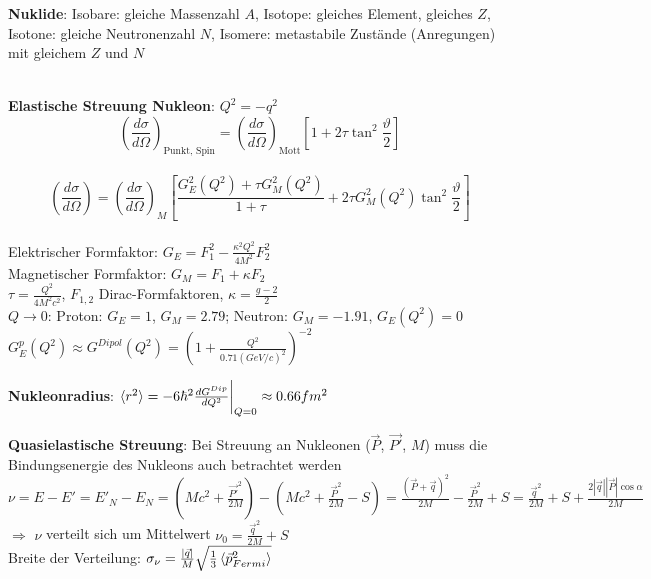 \documentclass[10pt,twoside,a4paper]{article}
\begin{document}
\begin{multicols*}{3}
\textbf{Nuklide}: Isobare: gleiche Massenzahl $A$, Isotope: gleiches Element, gleiches $Z$, Isotone: gleiche Neutronenzahl $N$, Isomere: metastabile Zustände (Anregungen) mit gleichem $Z$ und $N$

\ \\
\textbf{Elastische Streuung Nukleon}: $Q^2 = -q^2$ \\
$$\left(\frac{d\sigma}{d\Omega}\right)_{\text{Punkt, Spin}} = \left(\frac{d\sigma}{d\Omega}\right)_{\text{Mott}} \left[ 1 + 2 \tau \tan^2 \frac{\vartheta}{2} \right]$$ \\
$$\scriptscriptstyle{\left(\frac{d\sigma}{d\Omega}\right) = \left(\frac{d\sigma}{d\Omega}\right)_{M} \left[ \frac{G^2_E(Q^2) + \tau G^2_M(Q^2)}{1 + \tau} + 2 \tau G^2_M(Q^2) \tan^2 \frac{\vartheta}{2} \right]}$$ \\
Elektrischer Formfaktor: $G_E = F^2_1 - \frac{\kappa^2 Q^2}{4 M^2} F^2_2$ \\
Magnetischer Formfaktor: $G_M = F_1 + \kappa F_2$ \\
$\tau = \frac{Q^2}{4M^2 c^2}$, $F_{1,2}$ Dirac-Formfaktoren, $\kappa = \frac{g-2}{2}$ \\
$Q \to 0$: Proton: $G_E=1$, $G_M=2.79$; Neutron: $G_M=-1.91$, $G_E(Q^2)=0$ \\
$G^p_E(Q^2) \approx G^{Dipol}(Q^2) = \left(1 + \frac{Q^2}{0.71 (GeV/c)^2}\right)^{-2}$

\textbf{Nukleonradius}: $\braket{r^2} = -6 \hbar^2 \frac{dG^{Dip}}{dQ^2}\bigg|_{Q=0} \approx 0.66 fm^2$

\textbf{Quasielastische Streuung}: Bei Streuung an Nukleonen ($\vec{P}$, $\vec{P'}$, $M$) muss die Bindungsenergie des Nukleons auch betrachtet werden \\
$\nu = E - E' = E'_N - E_N = (M c^2 + \frac{\vec{P'}^2}{2 M}) - (M c^2 + \frac{\vec{P}^2}{2 M} - S) = \frac{(\vec{P} + \vec{q})^2}{2 M} - \frac{\vec{P}^2}{2 M} + S = \frac{\vec{q}^2}{2 M} + S + \frac{2 |\vec{q}| |\vec{P}| \cos \alpha}{2 M}$ \\
$\Rightarrow$ $\nu$ verteilt sich um Mittelwert $\nu_0 = \frac{\vec{q}^2}{2 M} + S$ \\
Breite der Verteilung: $\sigma_{\nu} = \frac{|\vec{q}|}{M} \sqrt{\frac{1}{3} \braket{\vec{p}^2_{Fermi}}}$


\end{multicols*}
\end{document}
